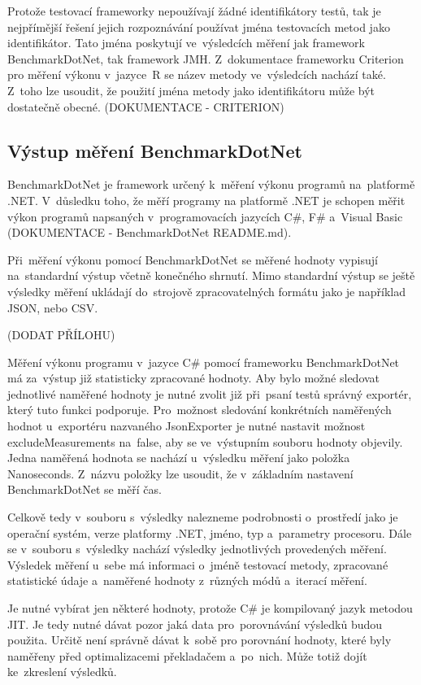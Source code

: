 Protože testovací frameworky nepoužívají žádné identifikátory testů, tak je nejpřímější
řešení jejich rozpoznávání používat jména testovacích metod jako identifikátor. Tato jména poskytují ve~výsledcích
měření jak framework BenchmarkDotNet, tak framework JMH. Z~dokumentace frameworku Criterion
pro měření výkonu v~jazyce~R se název metody ve~výsledcích nachází také. Z~toho lze
usoudit, že použití jména metody jako identifikátoru může být dostatečně obecné.
(DOKUMENTACE - CRITERION)

\subsection{Výstup měření BenchmarkDotNet}

BenchmarkDotNet je framework určený k~měření výkonu programů na~platformě .NET. V~důsledku
toho, že měří programy na platformě .NET je schopen měřit výkon programů napsaných
v~programovacích jazycích C\#, F\# a~Visual Basic (DOKUMENTACE - BenchmarkDotNet README.md).

Při~měření výkonu pomocí BenchmarkDotNet se měřené hodnoty vypisují na~standardní výstup
včetně konečného shrnutí. Mimo standardní výstup se ještě výsledky měření ukládají
do~strojově zpracovatelných formátu jako je například JSON, nebo CSV.

(DODAT PŘÍLOHU)

Měření výkonu programu v~jazyce C\# pomocí frameworku BenchmarkDotNet má za~výstup již statisticky zpracované hodnoty.
Aby bylo možné sledovat jednotlivé naměřené hodnoty je nutné zvolit již při~psaní testů správný
exportér, který tuto funkci podporuje. Pro~možnost sledování konkrétních naměřených hodnot u~exportéru
nazvaného JsonExporter je nutné nastavit možnost excludeMeasurements na~false, aby se ve~výstupním
souboru hodnoty objevily. Jedna naměřená hodnota se nachází u~výsledku měření jako položka Nanoseconds.
Z~názvu položky lze usoudit, že v~základním nastavení BenchmarkDotNet se měří čas.

Celkově tedy v~souboru s~výsledky nalezneme podrobnosti o~prostředí jako je operační systém,
verze platformy .NET, jméno, typ a~parametry procesoru. Dále se v~souboru s~výsledky nachází
výsledky jednotlivých provedených měření. Výsledek měření u~sebe má informaci o~jméně
testovací metody, zpracované statistické údaje a~naměřené hodnoty z~různých módů a~iterací měření.

Je nutné vybírat jen některé hodnoty, protože C\# je kompilovaný jazyk metodou
JIT. Je tedy nutné dávat pozor jaká data pro~porovnávání výsledků budou použita. Určitě není správně dávat
k~sobě pro porovnání hodnoty, které byly naměřeny před optimalizacemi překladačem a~po~nich. Může totiž dojít
ke~zkreslení výsledků.

